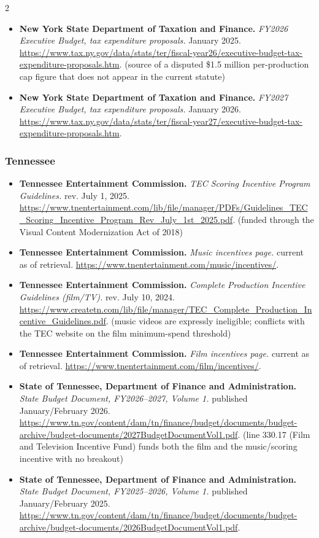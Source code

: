 {\begin{multicols}{2}
\begin{itemize}[itemsep=0pt,topsep=1pt,parsep=0pt,partopsep=0pt,leftmargin=1em]
\item \textbf{New York State Department of Taxation and Finance.} \textit{FY2026 Executive Budget, tax expenditure proposals.} January 2025. \url{https://www.tax.ny.gov/data/stats/ter/fiscal-year26/executive-budget-tax-expenditure-proposals.htm}. {\color{ammuted}(source of a disputed \$1.5 million per-production cap figure that does not appear in the current statute)}
\item \textbf{New York State Department of Taxation and Finance.} \textit{FY2027 Executive Budget, tax expenditure proposals.} January 2026. \url{https://www.tax.ny.gov/data/stats/ter/fiscal-year27/executive-budget-tax-expenditure-proposals.htm}.
\end{itemize}
\subsubsection*{Tennessee}
\begin{itemize}[itemsep=0pt,topsep=1pt,parsep=0pt,partopsep=0pt,leftmargin=1em]
\item \textbf{Tennessee Entertainment Commission.} \textit{TEC Scoring Incentive Program Guidelines.} rev. July 1, 2025. \url{https://www.tnentertainment.com/lib/file/manager/PDFs/Guidelines_TEC_Scoring_Incentive_Program_Rev_July_1st_2025.pdf}. {\color{ammuted}(funded through the Visual Content Modernization Act of 2018)}
\item \textbf{Tennessee Entertainment Commission.} \textit{Music incentives page.} current as of retrieval. \url{https://www.tnentertainment.com/music/incentives/}.
\item \textbf{Tennessee Entertainment Commission.} \textit{Complete Production Incentive Guidelines (film/TV).} rev. July 10, 2024. \url{https://www.createtn.com/lib/file/manager/TEC_Complete_Production_Incentive_Guidelines.pdf}. {\color{ammuted}(music videos are expressly ineligible; conflicts with the TEC website on the film minimum-spend threshold)}
\item \textbf{Tennessee Entertainment Commission.} \textit{Film incentives page.} current as of retrieval. \url{https://www.tnentertainment.com/film/incentives/}.
\item \textbf{State of Tennessee, Department of Finance and Administration.} \textit{State Budget Document, FY2026--2027, Volume 1.} published January/February 2026. \url{https://www.tn.gov/content/dam/tn/finance/budget/documents/budget-archive/budget-documents/2027BudgetDocumentVol1.pdf}. {\color{ammuted}(line 330.17 (Film and Television Incentive Fund) funds both the film and the music/scoring incentive with no breakout)}
\item \textbf{State of Tennessee, Department of Finance and Administration.} \textit{State Budget Document, FY2025--2026, Volume 1.} published January/February 2025. \url{https://www.tn.gov/content/dam/tn/finance/budget/documents/budget-archive/budget-documents/2026BudgetDocumentVol1.pdf}.
\end{itemize}

\end{multicols}}
